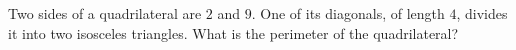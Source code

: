 Two sides of a quadrilateral are $2$ and $9$. One of its diagonals, of length $4$, divides it into two isosceles triangles. What is the perimeter of the quadrilateral?
